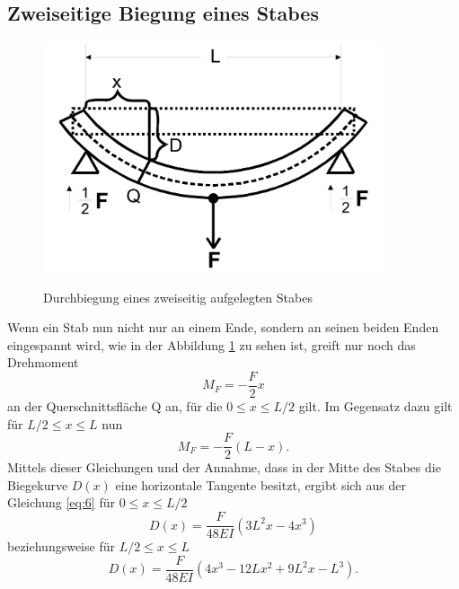 \subsection{Zweiseitige Biegung eines Stabes}


\begin{figure}[h]
    \centering
    \includegraphics[width=10cm]{Theorie5.png}
    \label{fig:theorie5}
    \caption{Durchbiegung eines zweiseitig aufgelegten Stabes}
\end{figure}    
\noindent
Wenn ein Stab nun nicht nur an einem Ende, sondern
an seinen beiden Enden eingespannt wird, wie in 
der Abbildung \ref{fig:theorie5} zu sehen ist, greift nur 
noch das Drehmoment 
\begin{equation}
    M_{F} = -\frac{F}{2}x
    \label{eq:9}
\end{equation}
\noindent an der Querschnittsfläche Q an, für die
$0 \leq x \leq L/2$ gilt. Im Gegensatz dazu gilt für 
$L/2 \leq x \leq L$ nun 
\begin{equation}
    M_{F} = -\frac{F}{2}(L-x).
    \label{eq:10}
\end{equation}
Mittels dieser Gleichungen und der Annahme, dass 
in der Mitte des Stabes die Biegekurve $D(x)$ eine
horizontale Tangente besitzt, ergibt sich aus der Gleichung
\ref{eq:6}
für $0 \leq x \leq L/2$
\begin{equation}
    D(x) = \frac{F}{48 E I} \left( 3 L^2 x - 4 x^3 \right)
    \label{eq:11}
\end{equation}
\noindent beziehungsweise für $L/2 \leq x \leq L$
\begin{equation}
    D(x) = \frac{F}{48 E I} \left( 4 x^3 - 12 L x^2 + 9 L^2 x - L^3 \right).
    \label{eq:12}
\end{equation}
